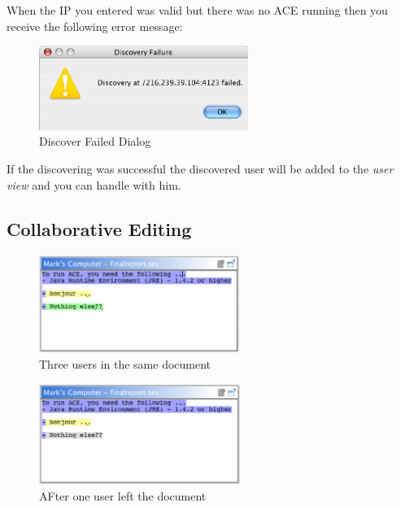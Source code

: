 \documentclass[11pt,a4paper]{article}
\begin{document}
When the IP you entered was valid but there was no ACE running then you receive the following error message:

\begin{figure}[H]
\begin{center}
  \includegraphics[height= 1.08in, width=2.68in]{../images/usermanual/discover_failed_no_ace.eps}
\caption{Discover Failed Dialog}
\end{center}
\end{figure}

If the discovering was successful the discovered user will be added to the \textit{user view} and you can handle with him.

\subsection{Collaborative Editing}
\label{collaborative_editing}

\begin{figure}[H]
\begin{center}
  \includegraphics[height=1.25in, width=2.56in]{../images/usermanual/editor_collab_3users.eps}
\caption{Three users in the same document}
\end{center}
\end{figure}

\begin{figure}[H]
\begin{center}
  \includegraphics[height=1.29in, width=2.57in]{../images/usermanual/editor_collab_user_left.eps}
\caption{AFter one user left the document}
\end{center}
\end{figure}
\end{document}
